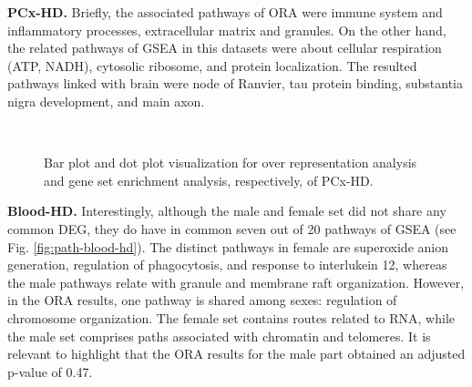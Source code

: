 \textbf{PCx-HD.} Briefly, the associated pathways of ORA were immune system and inflammatory processes, extracellular matrix and granules. On the other hand, the related pathways of GSEA in this datasets were about cellular respiration (ATP, NADH), cytosolic ribosome, and protein localization. The resulted pathways linked with brain were node of Ranvier, tau protein binding, substantia nigra development, and main axon.

\begin{figure}[!ht]%
    \centering
    \\
\caption{Bar plot and dot plot visualization for over representation analysis and gene set enrichment analysis, respectively, of PCx-HD.}
\label{fig:path-pcx-hd}%
\end{figure}

\textbf{Blood-HD.} Interestingly, although the male and female set did not share any common DEG, they do have in common seven out of 20 pathways of GSEA (see Fig. \ref{fig:path-blood-hd}). The distinct pathways in female are superoxide anion generation, regulation of phagocytosis, and response to interlukein 12, whereas the male pathways relate with granule and membrane raft organization. However, in the ORA results, one pathway is shared among sexes: regulation of chromosome organization. The female set contains routes related to RNA, while the male set comprises paths associated with chromatin and telomeres. It is relevant to highlight that the ORA results for the male part obtained an adjusted p-value of 0.47. 


